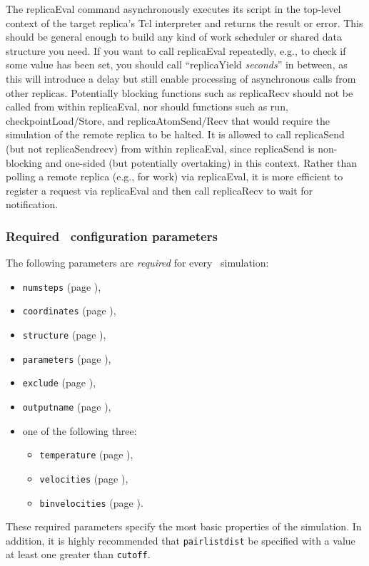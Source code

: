 The replicaEval command asynchronously executes its script in the top-level context
of the target replica's Tcl interpreter and returns the result or error.
This should be general enough to build any kind of work scheduler or shared data structure you need.
If you want to call replicaEval repeatedly, e.g., to check if some value has been set,
you should call ``replicaYield {\em seconds}'' in between, as this will introduce a delay but
still enable processing of asynchronous calls from other replicas.
Potentially blocking functions such as replicaRecv should not be called from within replicaEval,
nor should functions such as run, checkpointLoad/Store, and replicaAtomSend/Recv that would
require the simulation of the remote replica to be halted.
It is allowed to call replicaSend (but not replicaSendrecv) from within replicaEval, since
replicaSend is non-blocking and one-sided (but potentially overtaking) in this context.
Rather than polling a remote replica (e.g., for work) via replicaEval, it is more efficient
to register a request via replicaEval and then call replicaRecv to wait for notification.


\subsubsection{Required \NAMD\ configuration parameters}
\label{section:requiredparams}

The following parameters are {\em required} for every
\NAMD\ simulation:

\begin{itemize}

\item
{\tt numsteps} (page \pageref{param:numsteps}),

\item
{\tt coordinates} (page \pageref{param:coordinates}),

\item
{\tt structure} (page \pageref{param:structure}),

\item
{\tt parameters} (page \pageref{param:parameters}),

\item
{\tt exclude} (page \pageref{param:exclude}), 

\item
{\tt outputname} (page \pageref{param:outputname}), 

\item
one of the following three:
\begin{itemize}
\item
{\tt temperature} (page \pageref{param:temperature}),

\item
{\tt velocities} (page \pageref{param:velocities}),

\item
{\tt binvelocities} (page \pageref{param:binvelocities}).
\end{itemize}

\end{itemize}

\noindent These required parameters specify the most basic properties of
the simulation.  %
In addition, it is highly recommended that 
{\tt pairlistdist} be specified with a 
value at least one greater than {\tt cutoff}.

